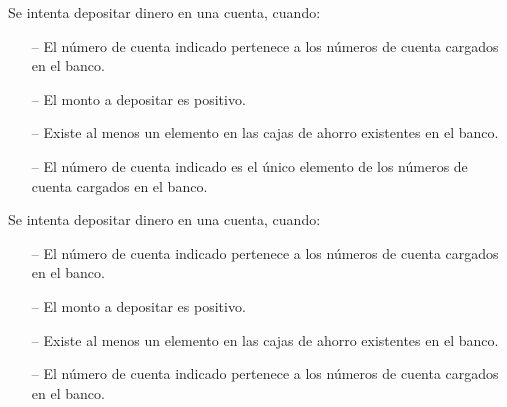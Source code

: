 \begin{tcolorbox}[colback=gray!5!white,colframe=gray!50!black,
  colbacktitle=gray!75!black,title=Depositar\_SP\_4]
  Se intenta depositar dinero en una cuenta, cuando:
     \begin{itemize}
        \item[--]{El número de cuenta indicado pertenece a los números de cuenta cargados en el banco.}
        \item[--]{El monto a depositar es positivo.}
        \item[--]{Existe al menos un elemento en las cajas de ahorro existentes en el banco.}
        \item[--]{El número de cuenta indicado es el único elemento de los números de cuenta cargados en el banco.}
     \end{itemize}
\end{tcolorbox}



\begin{tcolorbox}[colback=gray!5!white,colframe=gray!50!black,
  colbacktitle=gray!75!black,title=Depositar\_SP\_5]
  Se intenta depositar dinero en una cuenta, cuando:
     \begin{itemize}
        \item[--]{El número de cuenta indicado pertenece a los números de cuenta cargados en el banco.}
        \item[--]{El monto a depositar es positivo.}
        \item[--]{Existe al menos un elemento en las cajas de ahorro existentes en el banco.}
        \item[--]{El número de cuenta indicado pertenece a los números de cuenta cargados en el banco.}
     \end{itemize}
\end{tcolorbox}



